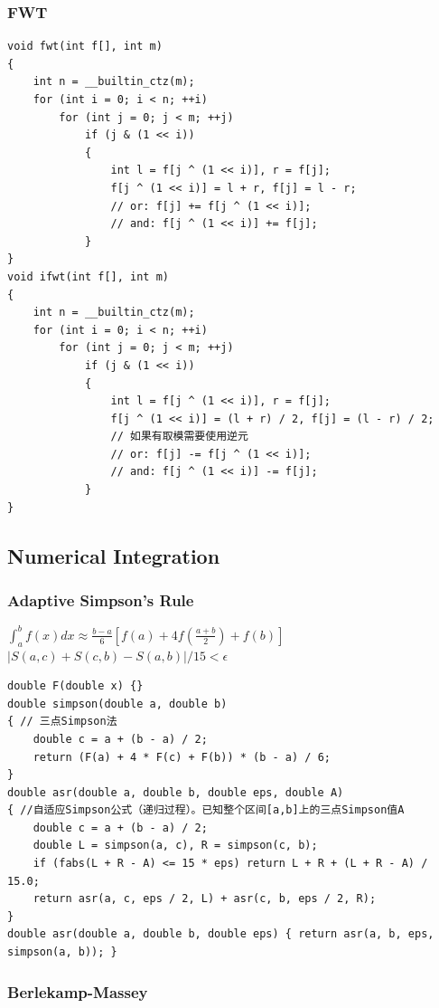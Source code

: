 \documentclass[twoside]{article}
\begin{document}
\subsubsection{FWT}
\begin{lstlisting}
void fwt(int f[], int m)
{
    int n = __builtin_ctz(m);
    for (int i = 0; i < n; ++i)
        for (int j = 0; j < m; ++j)
            if (j & (1 << i))
            {
                int l = f[j ^ (1 << i)], r = f[j];
                f[j ^ (1 << i)] = l + r, f[j] = l - r;
                // or: f[j] += f[j ^ (1 << i)];
                // and: f[j ^ (1 << i)] += f[j];
            }
}
void ifwt(int f[], int m)
{
    int n = __builtin_ctz(m);
    for (int i = 0; i < n; ++i)
        for (int j = 0; j < m; ++j)
            if (j & (1 << i))
            {
                int l = f[j ^ (1 << i)], r = f[j];
                f[j ^ (1 << i)] = (l + r) / 2, f[j] = (l - r) / 2;
                // 如果有取模需要使用逆元
                // or: f[j] -= f[j ^ (1 << i)];
                // and: f[j ^ (1 << i)] -= f[j];
            }
}
\end{lstlisting}

\subsection{Numerical Integration}
\subsubsection{Adaptive Simpson's Rule}

$\int _a^b f(x)dx  \approx \frac{b-a}{6}[f(a)+4f(\frac{a+b}{2})+f(b)]$\\
$|S(a, c) + S(c, b) - S(a, b)| / 15 < \epsilon$
\begin{lstlisting}
double F(double x) {}
double simpson(double a, double b)
{ // 三点Simpson法
    double c = a + (b - a) / 2;
    return (F(a) + 4 * F(c) + F(b)) * (b - a) / 6;
}
double asr(double a, double b, double eps, double A)
{ //自适应Simpson公式（递归过程）。已知整个区间[a,b]上的三点Simpson值A
    double c = a + (b - a) / 2;
    double L = simpson(a, c), R = simpson(c, b);
    if (fabs(L + R - A) <= 15 * eps) return L + R + (L + R - A) / 15.0;
    return asr(a, c, eps / 2, L) + asr(c, b, eps / 2, R);
}
double asr(double a, double b, double eps) { return asr(a, b, eps, simpson(a, b)); }
\end{lstlisting}

\subsubsection{Berlekamp-Massey}
\end{document}
